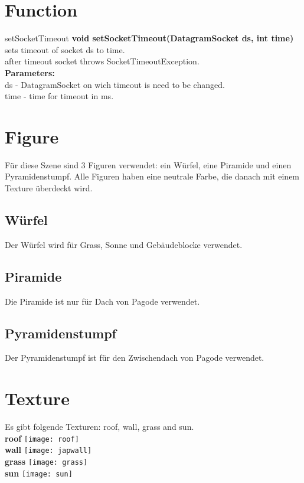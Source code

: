 \documentclass[12pt]{article}
\begin{document}
\pagebreak

\section{Function}
\begin{mybox}[colback=white]{setSocketTimeout}
\textbf{void setSocketTimeout(DatagramSocket ds, int time)} \\
sets timeout of socket ds to time. \\
after timeout socket throws SocketTimeoutException. \\
\textbf{Parameters:} \\
ds - DatagramSocket on wich timeout is need to be changed.  \\
time - time for timeout in ms.
\end{mybox}


\pagebreak
\section{Figure}
Für diese Szene sind 3 Figuren verwendet: ein Würfel, eine Piramide und einen Pyramidenstumpf. Alle Figuren haben eine neutrale Farbe, die danach mit einem Texture überdeckt wird. \\
\subsection{Würfel}
Der Würfel wird für Grass, Sonne und Gebäudeblocke verwendet.
\subsection{Piramide}
Die Piramide ist nur für Dach von Pagode verwendet.
\subsection{Pyramidenstumpf}
Der Pyramidenstumpf ist für den Zwischendach von Pagode verwendet.

\pagebreak

\section{Texture}
Es gibt folgende Texturen: roof, wall, grass and sun. \\
\textbf{roof} \newline
\texttt{[image: roof]} \\
\textbf{wall} \newline
\texttt{[image: japwall]} \\
\textbf{grass} \newline
\texttt{[image: grass]} \\
\textbf{sun} \newline
\texttt{[image: sun]}
\end{document}
